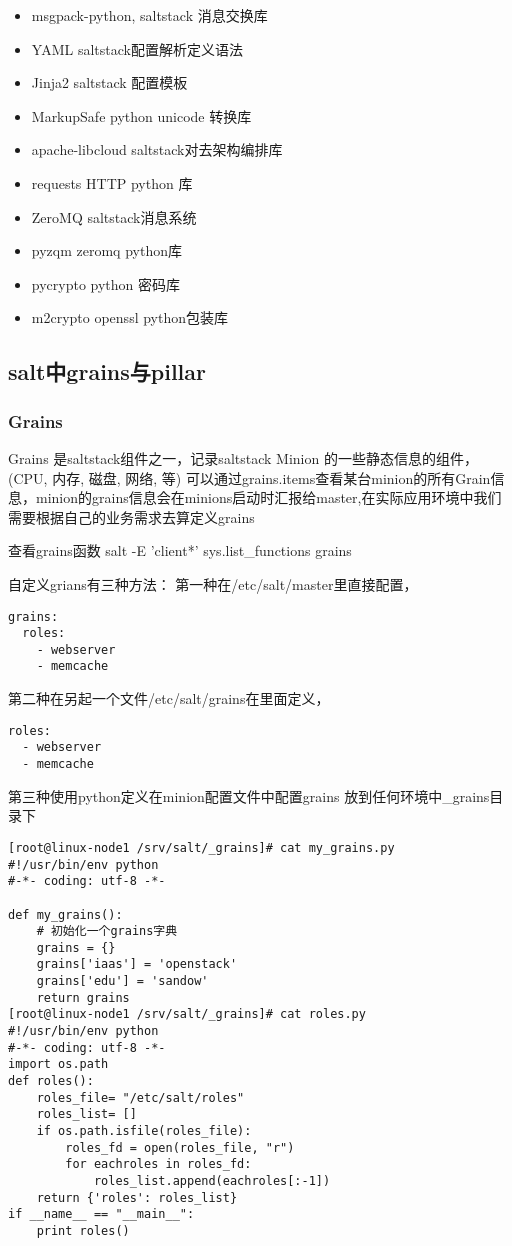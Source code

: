 \begin{itemize}
\item msgpack-python, saltstack 消息交换库
\item YAML saltstack配置解析定义语法
\item Jinja2 saltstack 配置模板
\item MarkupSafe python unicode 转换库
\item apache-libcloud saltstack对去架构编排库
\item requests HTTP python 库
\item ZeroMQ saltstack消息系统
\item pyzqm zeromq python库
\item pycrypto python 密码库
\item m2crypto openssl python包装库
\end{itemize}

\subsection{salt中grains与pillar}

\subsubsection{Grains}

Grains 是saltstack组件之一，记录saltstack Minion 的一些静态信息的组件，(CPU, 内存, 磁盘, 网络, 等) 可以通过grains.items查看某台minion的所有Grain信息，minion的grains信息会在minions启动时汇报给master,在实际应用环境中我们需要根据自己的业务需求去算定义grains


查看grains函数 salt -E 'client*' sys.list_functions grains

自定义grians有三种方法： 
第一种在/etc/salt/master里直接配置，

\begin{lstlisting}
grains:
  roles:
    - webserver
    - memcache
\end{lstlisting}

第二种在另起一个文件/etc/salt/grains在里面定义，

\begin{lstlisting}
roles:
  - webserver
  - memcache
\end{lstlisting}

第三种使用python定义在minion配置文件中配置grains 放到任何环境中_grains目录下

\begin{lstlisting}
[root@linux-node1 /srv/salt/_grains]# cat my_grains.py
#!/usr/bin/env python
#-*- coding: utf-8 -*-

def my_grains():
    # 初始化一个grains字典
    grains = {}
    grains['iaas'] = 'openstack'
    grains['edu'] = 'sandow'
    return grains
[root@linux-node1 /srv/salt/_grains]# cat roles.py
#!/usr/bin/env python
#-*- coding: utf-8 -*-
import os.path
def roles():
    roles_file= "/etc/salt/roles"
    roles_list= []
    if os.path.isfile(roles_file):
        roles_fd = open(roles_file, "r")
        for eachroles in roles_fd:
            roles_list.append(eachroles[:-1])
    return {'roles': roles_list}
if __name__ == "__main__":
    print roles()
\end{lstlisting}

